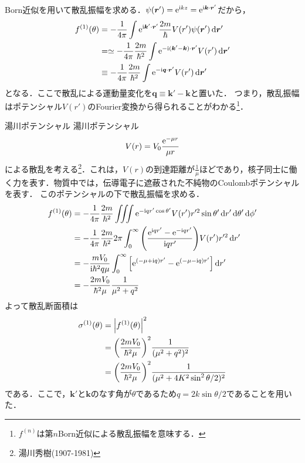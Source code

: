 \documentclass{report}
\begin{document}
 Born近似を用いて散乱振幅を求める．$\psi(\bm{r}') = \mathrm{e}^{\mathrm{i} kz} = \mathrm{e}^{\mathrm{i} \bm{k}\cdot\bm{r}'}$だから，
 \begin{align}
  f^{(1)}(\theta) &= -\frac{1}{4\pi} \int \mathrm{e}^{\mathrm{i} \bm{k}' \cdot \bm{r}'} \frac{2m}{\hbar} V(r') \psi(\bm{r}') \dd{\bm{r}'}\\
  &= \simeq -\frac{1}{4\pi}\frac{2m}{\hbar^2}\int\mathrm{e}^{-\mathrm{i} (\bm{k}' - \bm{k})\cdot \bm{r}'} V(r') \dd{\bm{r}'}\\
  & \equiv -\frac{1}{4\pi}\frac{2m}{\hbar^2}\int\mathrm{e}^{-\mathrm{i} \bm{q}\cdot \bm{r}'} V(r') \dd{\bm{r}'}
 \end{align}
 となる．ここで散乱による運動量変化を$\bm{q}\equiv \bm{k}' - \bm{k}$と置いた．
 つまり，散乱振幅はポテンシャル$V(r')$のFourier変換から得られることがわかる\footnote{$f^{(n)}$は第$n$Born近似による散乱振幅を意味する．}．
 \begin{myex}{湯川ポテンシャル}{}
湯川ポテンシャル
\begin{align}
  V(r) = V_0 \frac{\mathrm{e}^{-\mu r}}{\mu r}
\end{align}
による散乱を考える\footnote{湯川秀樹(1907-1981)}．これは，$V(r)$の到達距離が$\frac{1}{\mu}$ほどであり，核子同士に働く力を表す．物質中では，伝導電子に遮蔽された不純物のCoulombポテンシャルを表す．
このポテンシャルの下で散乱振幅を求める．
\begin{align}
  f^{(1)}(\theta) &= -\frac{1}{4\pi} \frac{2m}{\hbar^2} \iiint \mathrm{e}^{-\mathrm{i} qr'\cos\theta'}V(r') r'^2 \sin\theta'\dd{r'}\dd{\theta'}\dd{\phi'}\\
  &= -\frac{1}{4\pi}\frac{2m}{\hbar^2} 2\pi \int_{0}^{\infty} \qty(\frac{\mathrm{e}^{\mathrm{i} qr'} - \mathrm{e}^{-\mathrm{i} qr'}}{\mathrm{i} qr'})V(r') r'^2 \dd{r'}\\
  &= -\frac{mV_0}{\mathrm{i} \hbar^2 q \mu} \int_{0}^{\infty} \qty[\mathrm{e}^{(-\mu + \mathrm{i} q)r'} - \mathrm{e}^{(-\mu - \mathrm{i} q)r'}] \dd{r'}\\
  &= - \frac{2m V_0}{\hbar^2 \mu} \frac{1}{\mu^2 + q^2}
\end{align}
よって散乱断面積は
\begin{align}
  \sigma^{(1)}(\theta) &= \abs{f^{(1)}(\theta)}^2\\
  &= \qty(\frac{2m V_0}{\hbar^2 \mu})^2 \frac{1}{(\mu^2 + q^2)^2}\\
  &= \qty(\frac{2m V_0}{\hbar^2 \mu})^2 \frac{1}{(\mu^2 + 4K^2 \sin^2\theta/2)^2}
\end{align}
である．ここで，$\bm{k'}$と$\bm{k}$のなす角が$\theta$であるため$q = 2k\sin\theta/2$であることを用いた．
 \end{myex}
\end{document}
